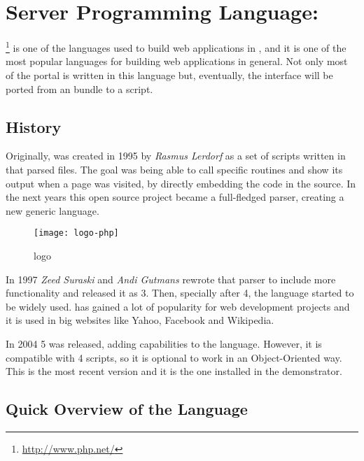 \section{Server Programming Language: } %
\label{sec:php}

\footnote{\url{http://www.php.net/}} is one of the languages used to build web applications in , and it is one of the most popular languages for building web applications in general.
Not only most of the portal is written in this language but, eventually, the  interface will be ported from an  bundle to a  script.

\subsection{History} %
\label{sub:phphistory}

Originally,  was created in 1995 by \emph{Rasmus Lerdorf} as a set of  scripts written in  that parsed  files.
The goal was being able to call specific  routines and show its output when a page was visited, by directly embedding the code in the  source.
In the next years this open source project became a full-fledged parser, creating a new generic language.

\begin{wrapfigure}{r}{0.5\textwidth}
  \centering
    \texttt{[image: logo-php]}
  \caption{ logo}
  \label{fig:logo-php}
\end{wrapfigure}

In 1997 \emph{Zeed Suraski} and \emph{Andi Gutmans} rewrote that parser to include more functionality and released it as  3.
Then, specially after  4, the language started to be widely used.
 has gained a lot of popularity for web development projects and it is used in big websites like Yahoo, Facebook and Wikipedia.

In 2004  5 was released, adding  capabilities to the language.
However, it is compatible with  4 scripts, so it is optional to work in an Object-Oriented way.
This is the most recent version and it is the one installed in the  demonstrator.


\subsection{Quick Overview of the Language} %
\label{sub:overviewphp}

